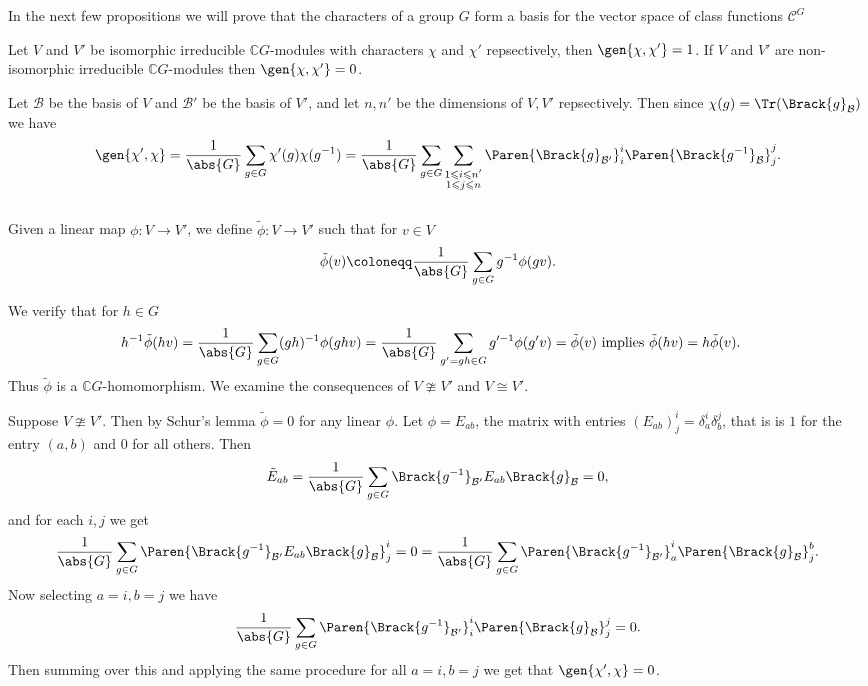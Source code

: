 \documentclass[../Project.tex]{subfiles}
\begin{document}
In the next few propositions we will prove that the characters of a group $G$ form a basis for the vector space of class functions $\mathcal{C}^G$

\begin{theo}
\label{irrcharorth}
	Let $V$ and $V'$ be isomorphic irreducible $\mathbb{C}G$-modules with characters $\chi$ and $\chi'$ repsectively, then
	$\gen{\chi,\chi'} = 1$. If $V$ and $V'$ are non-isomorphic irreducible $\mathbb{C}G$-modules then $\gen{\chi,\chi'} = 0$.
\end{theo}
\begin{proo*}[{\cite[page 28]{3}}]
	Let $\mathcal{B}$ be the basis of $V$ and $\mathcal{B}'$ be the basis of $V'$, and let $n,n'$ be the dimensions of $V,V'$ repsectively. Then since $\chi(g) = \Tr(\Brack{g}_\mathcal{B})$ we have
	$$\gen{\chi',\chi} = \frac{1}{\abs{G}}\sum_{g \in G}\chi'(g)\chi(g^{-1}) = \frac{1}{\abs{G}}\sum_{g \in G}\sum_{\substack{1 \leqslant i \leqslant n' \\ 1 \leqslant j \leqslant n}}\Paren{\Brack{g}_{\mathcal{B}'}}^i_i\Paren{\Brack{g^{-1}}_{\mathcal{B}}}^j_j.$$\\

	Given a linear map $\phi : V \to V'$, we define $\tilde{\phi} : V \to V'$ such that for $v \in V$
	$$\tilde{\phi}(v) \coloneqq \frac{1}{\abs{G}}\sum_{g \in G}g^{-1}\phi(gv).$$

	We verify that for $h \in G$
	\begin{align*}
		h^{-1}\tilde\phi(hv) &= \frac{1}{\abs{G}}\sum_{g \in G}(gh)^{-1}\phi(ghv) = \frac{1}{\abs{G}}\sum_{g' = gh \in G}g'^{-1}\phi(g'v) = \tilde\phi(v) \text{ implies } \tilde\phi(hv) = h\tilde\phi(v).
	\end{align*}
	Thus $\tilde\phi$ is a $\mathbb{C}G$-homomorphism. We examine the consequences of $V \ncong V'$ and $V \cong V'$.
	\begin{menum}
		\item Suppose $V \ncong V'$. Then by Schur's lemma $\tilde\phi = 0$ for any linear $\phi$. Let $\phi = E_{ab}$, the matrix with entries $(E_{ab})^{i}_j = \delta^i_a\delta^j_b$, that is is $1$ for the entry $(a,b)$ and $0$ for all others.
		Then
		$$\tilde E_{ab} = \frac{1}{\abs{G}}\sum_{g \in G}\Brack{g^{-1}}_{\mathcal{B}'}E_{ab}\Brack{g}_\mathcal{B} = 0,$$
		and for each $i,j$ we get
		$$\frac{1}{\abs{G}}\sum_{g \in G}\Paren{\Brack{g^{-1}}_{\mathcal{B}'}E_{ab}\Brack{g}_\mathcal{B}}^i_j = 0 = \frac{1}{\abs{G}}\sum_{g \in G}\Paren{\Brack{g^{-1}}_{\mathcal{B}'}}^i_a\Paren{\Brack{g}_\mathcal{B}}^b_j.$$
		Now selecting $a = i, b = j$ we have 
		$$\frac{1}{\abs{G}}\sum_{g \in G}\Paren{\Brack{g^{-1}}_{\mathcal{B}'}}^i_i\Paren{\Brack{g}_\mathcal{B}}^j_j = 0.$$
		Then summing over this and applying the same procedure for all $a = i, b = j$ we get that $\gen{\chi',\chi} = 0$.



\end{menum}
\end{proo*}
\end{document}
